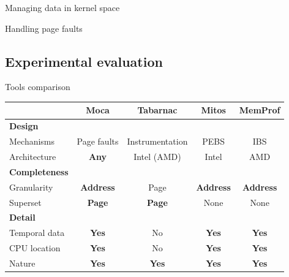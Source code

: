 \documentclass[xcolor={usenames,dvipsnames},hyperref={pdfusetitle}]{beamer}
\begin{document}
\begin{frame}{Managing data in kernel space}
    \centering
    \resizebox{!}{.85\textheight}{
        
    }
\end{frame}

\begin{frame}{Handling page faults}
    \centering
    \resizebox{!}{.8\textheight}{
        
    }
\end{frame}

\subsection{Experimental evaluation}

\begin{frame}{Tools comparison}
    \small
    \begin{tabular}{lcccc}
        \toprule
         & \textbf{Moca} & \textbf{Tabarnac} & \textbf{Mitos} & \textbf{MemProf} \\
            \midrule
            \textbf{Design} & & & &\\
            \midrule
            Mechanisms   & Page faults  & Instrumentation & PEBS & IBS \\
            Architecture & \textbf{Any} & Intel (AMD) & Intel & AMD   \\
            \midrule
            \textbf{Completeness} & & & &\\
            \midrule
            Granularity & \textbf{Address} & Page          & \textbf{Address} & \textbf{Address} \\
            Superset          & \textbf{Page} & \textbf{Page} & None             & None             \\
            \midrule
            \textbf{Detail} & & & &\\
            \midrule
            Temporal data & \textbf{Yes} & No          & \textbf{Yes} & \textbf{Yes} \\
            CPU location  & \textbf{Yes} & No          & \textbf{Yes} & \textbf{Yes} \\
            Nature        & \textbf{Yes} &\textbf{Yes} & \textbf{Yes} &\textbf{Yes}  \\
        \bottomrule
    \end{tabular}
\end{frame}
\end{document}
